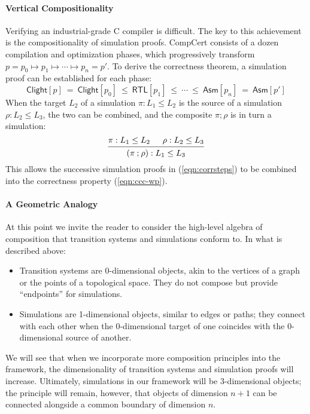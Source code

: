 \documentclass[acmsmall,screen,review,anonymous]{acmart}
\newcommand{\kw}[1]{\ensuremath{ \mathsf{#1} }}
\begin{document}
\paragraph{Vertical Compositionality}

Verifying an industrial-grade C compiler %
is difficult.
The key to this achievement is the compositionality of simulation proofs.
CompCert consists of a dozen compilation and optimization phases,
which progressively transform %
$
  p = p_0 \longmapsto p_1 \longmapsto \cdots \longmapsto p_n = p'
$.
To derive the correctness theorem,
a simulation proof can be established for each phase:
\begin{equation}
  \kw{Clight}[p] \:=\:
  \kw{Clight}[p_0] \:\le\: \kw{RTL}[p_1] \:\le\: \cdots \:\le\: \kw{Asm}[p_n]
  \:=\: \kw{Asm}[p']
  \label{eqn:corrsteps}
\end{equation}
When the target $L_2$ of a simulation $\pi : L_1 \le L_2$
is the source of a simulation $\rho : L_2 \le L_3$,
the two can be combined, and the composite $\pi \mathbin; \rho$
is in turn a simulation:
\[
  \begin{prooftree}
    \hypo{\pi : L_1 \le L_2}
    \hypo{\rho : L_2 \le L_3}
    \infer2{(\pi \mathbin; \rho) : L_1 \le L_3}
  \end{prooftree}
\]
This allows
the successive simulation proofs in (\ref{eqn:corrsteps})
to be combined into the correctness property (\ref{eqn:ccc-wp}).

\paragraph{A Geometric Analogy}

At this point we invite the reader
to consider the high-level
algebra of composition that
transition systems and simulations conform to.
In what is described above:
\begin{itemize}
  \item Transition systems are 0-dimensional objects,
    akin to the vertices of a graph or
    the points of a topological space.
    They do not compose
    but provide ``endpoints'' for simulations.
  \item Simulations are 1-dimensional objects,
    similar to edges or paths;
    they connect with each other
    when the 0-dimensional target of one coincides with
    the 0-dimensional source of another.
\end{itemize}
%
%
We will see that
when we incorporate more composition principles into the framework,
the dimensionality of transition systems and simulation proofs will increase.
Ultimately,
simulations in our framework will be 3-dimensional objects;
the principle will remain, however,
that objects of dimension $n+1$ can be connected
alongside a common boundary of dimension $n$.
\end{document}

